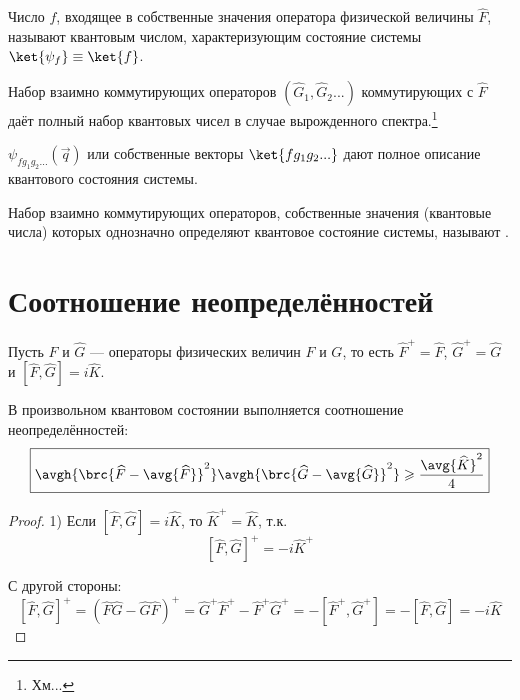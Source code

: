 \begin{exmpl}
\begin{defn}
Число $f$, входящее в собственные значения оператора физической величины $\widehat{F}$, называют квантовым числом, характеризующим состояние системы $\ket{\psi_f}\equiv\ket{f}$.
\end{defn}

Набор взаимно коммутирующих операторов $(\widehat{G}_1, \widehat{G}_2...)$ коммутирующих с $\widehat{F}$ даёт полный набор квантовых чисел в случае вырожденного спектра.\footnote{Хм...}

$\psi_{f g_1 g_2 ...}(\vec{q})$ или собственные векторы $\ket{f g_1 g_2 ...}$ дают полное описание квантового состояния системы.

\begin{defn}
Набор взаимно коммутирующих операторов, собственные значения (квантовые числа) которых однозначно определяют квантовое состояние системы, называют .
\end{defn}

\section{Соотношение неопределённостей}

Пусть $\widehat{F}$ и $\widehat{G}$ --- операторы физических величин $F$ и $G$, то есть $\widehat{F}^+=\widehat{F}$, $\widehat{G}^+=\widehat{G}$ и $[\widehat{F},\widehat{G}]=i\widehat{K}$.

\begin{thm}
В произвольном квантовом состоянии выполняется соотношение неопределённостей:
$$\boxed{\avgh{\brc{\widehat{F}-\avg{\widehat{F}}}^2} \avgh{\brc{\widehat{G}-\avg{\widehat{G}}}^2} \geqslant \frac{\avg{\widehat{K}}^2}{4}}$$
\end{thm}

\begin{proof}
1) Если $[\widehat{F},\widehat{G}]=i\widehat{K}$, то $\widehat{K}^+=\widehat{K}$, т.к.
\begin{equation}
\label{eq:4_2_1}
[\widehat{F},\widehat{G}]^+=-i\widehat{K}^+
\end{equation}

С другой стороны:
\begin{equation}
\label{eq:4_2_2}
[\widehat{F},\widehat{G}]^+=
(\widehat{F}\widehat{G}-\widehat{G}\widehat{F})^+=\widehat{G}^+\widehat{F}^+-\widehat{F}^+\widehat{G}^+=
-[\widehat{F}^+,\widehat{G}^+]=
-[\widehat{F},\widehat{G}]=
-i\widehat{K}
\end{equation}


\end{proof}
\end{exmpl}
